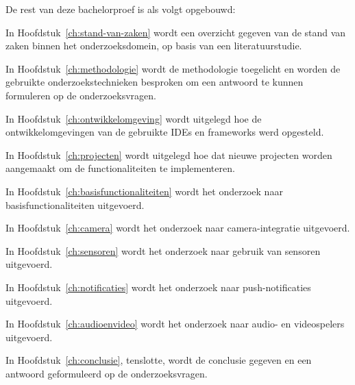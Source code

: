 
De rest van deze bachelorproef is als volgt opgebouwd:

In Hoofdstuk~\ref{ch:stand-van-zaken} wordt een overzicht gegeven van de stand van zaken binnen het onderzoeksdomein, op basis van een literatuurstudie.

In Hoofdstuk~\ref{ch:methodologie} wordt de methodologie toegelicht en worden de gebruikte onderzoekstechnieken besproken om een antwoord te kunnen formuleren op de onderzoeksvragen.

In Hoofdstuk~\ref{ch:ontwikkelomgeving} wordt uitgelegd hoe de ontwikkelomgevingen van de gebruikte IDEs en frameworks werd opgesteld.

In Hoofdstuk~\ref{ch:projecten} wordt uitgelegd hoe dat nieuwe projecten worden aangemaakt om de functionaliteiten te implementeren.

In Hoofdstuk~\ref{ch:basisfunctionaliteiten} wordt het onderzoek naar basisfunctionaliteiten uitgevoerd.

In Hoofdstuk~\ref{ch:camera} wordt het onderzoek naar camera-integratie uitgevoerd.

In Hoofdstuk~\ref{ch:sensoren} wordt het onderzoek naar gebruik van sensoren uitgevoerd.

In Hoofdstuk~\ref{ch:notificaties} wordt het onderzoek naar push-notificaties uitgevoerd.

In Hoofdstuk~\ref{ch:audioenvideo} wordt het onderzoek naar audio- en videospelers uitgevoerd.

In Hoofdstuk~\ref{ch:conclusie}, tenslotte, wordt de conclusie gegeven en een antwoord geformuleerd op de onderzoeksvragen.













